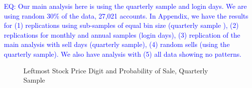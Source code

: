 \clearpage
\textcolor{blue}{EQ: Our main analysis here is using the quarterly sample and login days. We are using random 30\% of the data, 27,021 accounts. In Appendix, we have the results for (1) replications using sub-samples of equal bin size (quarterly sample ),  (2) replications for monthly and annual samples (login days), (3) replication of the main analysis with sell days (quarterly sample), (4) random sells (using the quarterly sample). We also have analysis with (5) all data showing no patterns.   }

\begin{figure}[hbt!]
	\caption{Leftmost Stock Price Digit and Probability of Sale, Quarterly Sample}%
	\label{fig:left_digit_sell}%
	\centering%
	\bigskip
\end{figure}


